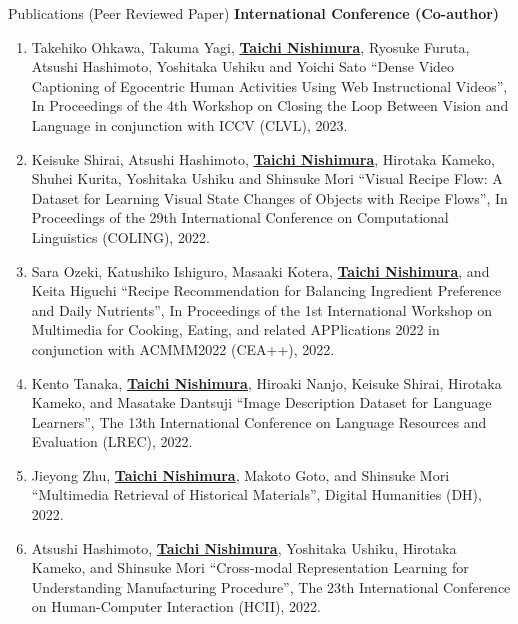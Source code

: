 \begin{rSection}{Publications (Peer Reviewed Paper)}
{\bf International Conference (Co-author)}
\vspace{-0.15cm}
\begin{enumerate}
    \item Takehiko Ohkawa, Takuma Yagi, \underline{{\bf Taichi Nishimura}}, Ryosuke Furuta, Atsushi Hashimoto, Yoshitaka Ushiku and Yoichi Sato ``Dense Video Captioning of Egocentric Human Activities Using Web Instructional Videos'', In Proceedings of the 4th Workshop on Closing the Loop Between Vision and Language in conjunction with ICCV (CLVL), 2023.
    \item Keisuke Shirai, Atsushi Hashimoto, \underline{{\bf Taichi Nishimura}}, Hirotaka Kameko, Shuhei Kurita, Yoshitaka Ushiku and Shinsuke Mori ``Visual Recipe Flow: A Dataset for Learning Visual State Changes of Objects with Recipe Flows'', In Proceedings of the 29th International Conference on Computational Linguistics (COLING), 2022.
    \item Sara Ozeki, Katushiko Ishiguro, Masaaki Kotera, \underline{{\bf Taichi Nishimura}}, and Keita Higuchi ``Recipe Recommendation for Balancing Ingredient Preference and Daily Nutrients'', In Proceedings of the 1st International Workshop on Multimedia for Cooking, Eating, and related APPlications 2022 in conjunction with ACMMM2022 (CEA++), 2022.
    \item Kento Tanaka, \underline{{\bf Taichi Nishimura}}, Hiroaki Nanjo, Keisuke Shirai, Hirotaka Kameko, and Masatake Dantsuji ``Image Description Dataset for Language Learners'', The 13th International Conference on Language Resources and Evaluation (LREC), 2022.
    \item Jieyong Zhu, \underline{{\bf Taichi Nishimura}}, Makoto Goto, and Shinsuke Mori ``Multimedia Retrieval of Historical Materials'', Digital Humanities (DH), 2022.
    \item Atsushi Hashimoto, \underline{{\bf Taichi Nishimura}}, Yoshitaka Ushiku, Hirotaka Kameko, and Shinsuke Mori ``Cross-modal Representation Learning for Understanding Manufacturing Procedure'', The 23th International Conference on Human-Computer Interaction (HCII), 2022.
\end{enumerate}
\end{rSection}

